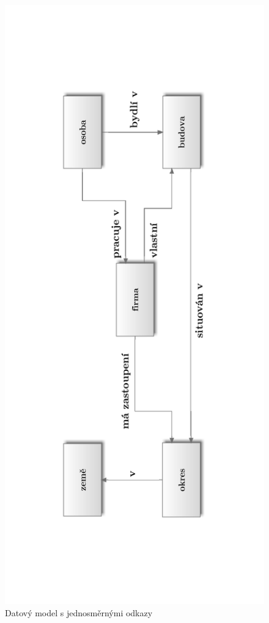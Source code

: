 \begin{figure}
\centering\includegraphics[angle=-90,width=14cm]{graphics/01-sitovy2}
\caption{Datový model s jednosměrnými odkazy}
\end{figure}

